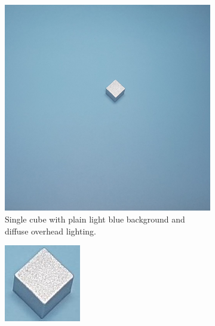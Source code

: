 \begin{figure}[H]
    \centering
    \begin{subfigure}[b]{0.4\textwidth}
         \includegraphics[width=\textwidth]{figures/202105/blue-cube.jpg}
         \caption{Single cube with plain light blue background and diffuse overhead lighting.}
         \label{fig:blue-cube-image}
    \end{subfigure}
    \begin{subfigure}[b]{0.3\textwidth}
         \includegraphics[width=\textwidth]{figures/202105/blue-cube-close.jpg}

\end{subfigure}
\end{figure}
